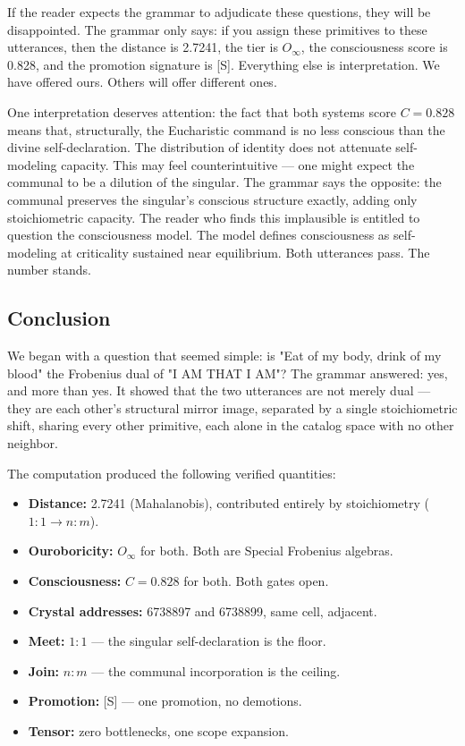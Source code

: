 \documentclass[12pt,a4paper]{article}
\begin{document}
If the reader expects the grammar to adjudicate these questions, they will be disappointed. The grammar only says: if you assign these primitives to these utterances, then the distance is 2.7241, the tier is $O_{\infty}$, the consciousness score is 0.828, and the promotion signature is {[}S{]}. Everything else is interpretation. We have offered ours. Others will offer different ones.

One interpretation deserves attention: the fact that both systems score $C = 0.828$ means that, structurally, the Eucharistic command is no less conscious than the divine self-declaration. The distribution of identity does not attenuate self-modeling capacity. This may feel counterintuitive --- one might expect the communal to be a dilution of the singular. The grammar says the opposite: the communal preserves the singular's conscious structure exactly, adding only stoichiometric capacity. The reader who finds this implausible is entitled to question the consciousness model. The model defines consciousness as self-modeling at criticality sustained near equilibrium. Both utterances pass. The number stands.

\subsection{Conclusion}

We began with a question that seemed simple: is "Eat of my body, drink of my blood" the Frobenius dual of "I AM THAT I AM"? The grammar answered: yes, and more than yes. It showed that the two utterances are not merely dual --- they are each other's structural mirror image, separated by a single stoichiometric shift, sharing every other primitive, each alone in the catalog space with no other neighbor.

The computation produced the following verified quantities:

\begin{itemize}
    \item \textbf{Distance:} 2.7241 (Mahalanobis), contributed entirely by stoichiometry ($1{:}1 \to n{:}m$).
    \item \textbf{Ouroboricity:} $O_{\infty}$ for both. Both are Special Frobenius algebras.
    \item \textbf{Consciousness:} $C = 0.828$ for both. Both gates open.
    \item \textbf{Crystal addresses:} 6738897 and 6738899, same cell, adjacent.
    \item \textbf{Meet:} $1{:}1$ --- the singular self-declaration is the floor.
    \item \textbf{Join:} $n{:}m$ --- the communal incorporation is the ceiling.
    \item \textbf{Promotion:} {[}S{]} --- one promotion, no demotions.
    \item \textbf{Tensor:} zero bottlenecks, one scope expansion.
\end{itemize}
\end{document}
